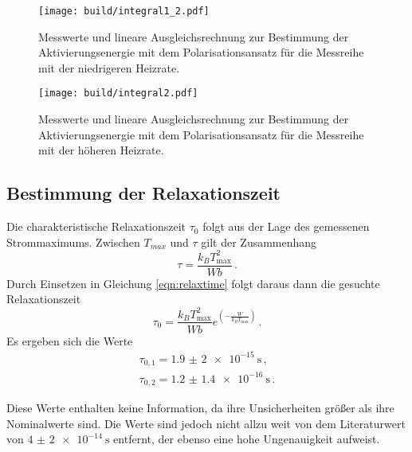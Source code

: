 \begin{figure}
  \centering
  \texttt{[image: build/integral1\_2.pdf]}
  \caption{Messwerte und lineare Ausgleichsrechnung zur Bestimmung der Aktivierungsenergie mit dem Polarisationsansatz für
  die Messreihe mit der niedrigeren Heizrate.}
  \label{fig:integral1_2}
\end{figure}
\begin{figure}
  \centering
  \texttt{[image: build/integral2.pdf]}
  \caption{Messwerte und lineare Ausgleichsrechnung zur Bestimmung der Aktivierungsenergie mit dem Polarisationsansatz für
  die Messreihe mit der höheren Heizrate.}
  \label{fig:integral2}
\end{figure}

\subsection{Bestimmung der Relaxationszeit}

Die charakteristische Relaxationszeit $\tau_0$ folgt aus der Lage des gemessenen Strommaximums.
Zwischen $T_{max}$ und $\tau$ gilt der Zusammenhang
\begin{equation*}
	\tau=\frac{k_B T_{\text{max}}^2}{W b} \,.
\end{equation*}
Durch Einsetzen in Gleichung \eqref{eqn:relaxtime} folgt daraus dann die
gesuchte Relaxationszeit
\begin{equation*}
	\tau_0=\frac{k_B T_{\text{max}}^2}{W b} e^{\left(-\frac{W}{k_B T_{\text{max}}}\right)} \,.
\end{equation*}
Es ergeben sich die Werte
\begin{align}
	\tau_{0,1}=\SI{1.9(20)e-15}{\second} \,, \\
	\tau_{0,2}=\SI{1.2(14)e-16}{\second} \,.
\end{align}

Diese Werte enthalten keine Information, da ihre Unsicherheiten größer als ihre Nominalwerte sind. Die Werte sind jedoch nicht allzu weit von dem Literaturwert von $\SI{4(2)e-14}{\second}$ \cite{3} entfernt, der ebenso eine hohe Ungenauigkeit aufweist.
